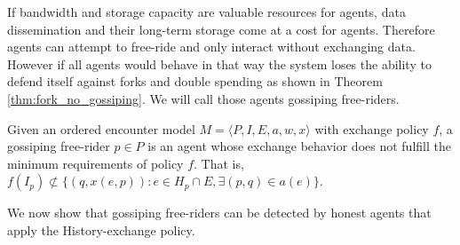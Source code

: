 If bandwidth and storage capacity are valuable resources for agents, data dissemination and their 
long-term storage come at a cost for agents. Therefore agents can attempt to free-ride and only 
interact without exchanging data. However if all agents would behave in that way the system loses 
the ability to defend itself against forks and double spending as shown in Theorem 
\ref{thm:fork_no_gossiping}. We will call those agents gossiping free-riders. 



\begin{defn}
    \label{def:gos_free-rider}
    Given an ordered encounter model $M = \langle P, I, E, a, w, x \rangle$ with exchange policy $f$, a gossiping free-rider $p \in P$ is an 
    agent whose exchange behavior does not fulfill the minimum requirements of policy $f$. That is, 
    $f(I_p) \nsubset \{ (q, x(e, p)) : e \in H_p \cap E, \exists (p, q) \in a(e)\}$.
\end{defn}

We now show that gossiping free-riders can be detected by honest agents that apply the History-exchange
policy.

